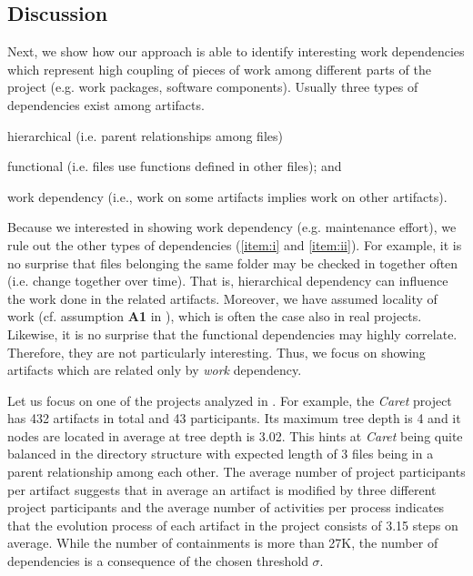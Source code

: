 \subsection{Discussion}
\label{subsec:discussion}

Next, we show how our approach is able to identify interesting work dependencies which represent high coupling of pieces of work among different parts of the project (e.g. work packages, software components). Usually three types of dependencies exist among artifacts. 
\begin{inparaenum}[\itshape i)]
	\item \label{item:i} hierarchical (i.e. parent relationships among files) 
	\item \label{item:ii} functional (i.e. files use functions defined in other files); and 
	\item work dependency (i.e., work on some artifacts implies work on other artifacts).
\end{inparaenum} 

Because we interested in showing work dependency (e.g. maintenance effort), we rule out the other types of dependencies (\ref{item:i} and \ref{item:ii}). For example, it is no surprise that files belonging the same folder may be checked in together often (i.e. change together over time). That is, hierarchical dependency can influence the work done in the related artifacts. Moreover, we have assumed locality of work (cf. assumption \textbf{A1} in  ), which is often the case also in real projects. Likewise, it is no surprise that the functional dependencies may highly correlate. Therefore, they are not particularly interesting. Thus, we focus on showing artifacts which are related only by \emph{work} dependency.

Let us focus on one of the projects analyzed in . For example, the \emph{Caret} project has 432 artifacts in total and 43 participants. Its maximum tree depth is 4 and it nodes are located in average at tree depth is 3.02. This hints at \emph{Caret} being quite balanced in the directory structure with expected length of 3 files being in a parent relationship among each other. The average number of project participants per artifact suggests that in average an artifact is modified by three different project participants and the average number of activities per process indicates that the evolution process of each artifact in the project consists of 3.15 steps on average. While the number of containments is more than 27K, the number of dependencies is a consequence of the chosen threshold $\sigma$. 


